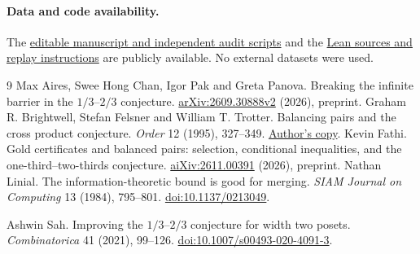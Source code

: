 \documentclass[11pt]{article}
\newcommand{\repo}{https://github.com/Aafimalek/novel-discoveries/tree/research/parallel-foundations/width-three-posets}
\begin{document}
\paragraph{Data and code availability.}
The \href{\repo/paper}{editable manuscript and independent audit scripts}
and the \href{\repo/verification/two-by-three-balanced}{Lean sources and
replay instructions} are publicly available. No external datasets were used.



\begin{thebibliography}{9}
 Max Aires, Swee Hong Chan, Igor Pak and Greta Panova.
Breaking the infinite barrier in the $1/3$--$2/3$ conjecture.
\href{https://arxiv.org/abs/2609.30888v2}{arXiv:2609.30888v2} (2026), preprint.
 Graham R. Brightwell, Stefan Felsner and William T. Trotter.
Balancing pairs and the cross product conjecture.
\emph{Order} 12 (1995), 327--349.
\href{https://trotter.math.gatech.edu/papers/97.pdf}{Author's copy}.
 Kevin Fathi.
Gold certificates and balanced pairs: selection, conditional inequalities,
and the one-third--two-thirds conjecture.
\href{https://aixiv.online/abs/2611.00391}{aiXiv:2611.00391} (2026), preprint.
 Nathan Linial.
The information-theoretic bound is good for merging.
\emph{SIAM Journal on Computing} 13 (1984), 795--801.
\href{https://doi.org/10.1137/0213049}{doi:10.1137/0213049}.

 Ashwin Sah.
Improving the $1/3$--$2/3$ conjecture for width two posets.
\emph{Combinatorica} 41 (2021), 99--126.
\href{https://doi.org/10.1007/s00493-020-4091-3}{doi:10.1007/s00493-020-4091-3}.
\end{thebibliography}
\end{document}
